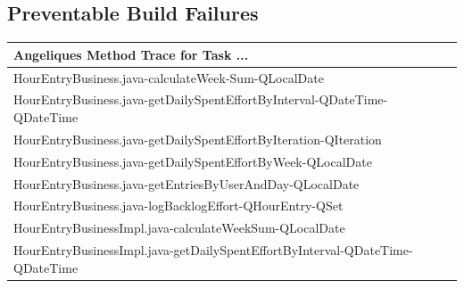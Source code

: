 \subsection{Preventable Build Failures}
\begin{table}[t!]
\centering\small
\begin{tabular}{l}
\toprule
Angeliques Method Trace for Task ... \\%
\midrule
     HourEntryBusiness.java-calculateWeek-Sum-QLocalDate                                                                  \\%
     HourEntryBusiness.java-getDailySpentEffortByInterval-QDateTime-QDateTime                                    \\%
     HourEntryBusiness.java-getDailySpentEffortByIteration-QIteration                                                     \\%
     HourEntryBusiness.java-getDailySpentEffortByWeek-QLocalDate                                                           \\%
     HourEntryBusiness.java-getEntriesByUserAndDay-QLocalDate                                                            \\%
     HourEntryBusiness.java-logBacklogEffort-QHourEntry-QSet                                              \\%
     HourEntryBusinessImpl.java-calculateWeekSum-QLocalDate                                                   \\%
     HourEntryBusinessImpl.java-getDailySpentEffortByInterval-QDateTime-QDateTime                                  \\%

\end{tabular}
\end{table}
